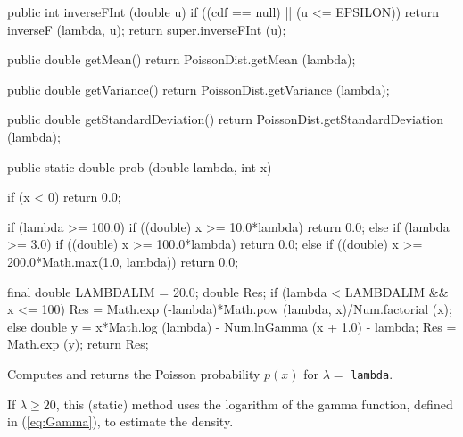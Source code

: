 \begin{code}
\begin{hide}
   public int inverseFInt (double u) {
      if ((cdf == null) || (u <= EPSILON))
         return inverseF (lambda, u);
      return super.inverseFInt (u);
   }

   public double getMean() {
      return PoissonDist.getMean (lambda);
   }

   public double getVariance() {
      return PoissonDist.getVariance (lambda);
   }

   public double getStandardDeviation() {
      return PoissonDist.getStandardDeviation (lambda);
   }\end{hide}

   public static double prob (double lambda, int x)\begin{hide} {
      if (x < 0)
         return 0.0;

      if (lambda >= 100.0) {
         if ((double) x >= 10.0*lambda)
            return 0.0;
      } else if (lambda >= 3.0) {
         if ((double) x >= 100.0*lambda)
            return 0.0;
      } else {
         if ((double) x >= 200.0*Math.max(1.0, lambda))
            return 0.0;
      }

      final double LAMBDALIM = 20.0;
      double Res;
      if (lambda < LAMBDALIM && x <= 100)
         Res = Math.exp (-lambda)*Math.pow (lambda, x)/Num.factorial (x);
      else {
         double y = x*Math.log (lambda) - Num.lnGamma (x + 1.0) - lambda;
         Res = Math.exp (y);
      }
      return Res;
   }\end{hide}
\end{code}
 \begin{tabb}  Computes and returns the Poisson probability
  $p(x)$ for $\lambda = $ \texttt{lambda}.
\begin{detailed}
 If $\lambda\ge 20$, this (static) method uses the logarithm of the gamma
  function, defined in (\ref{eq:Gamma}), to estimate the density.
\end{detailed}
 \end{tabb}
